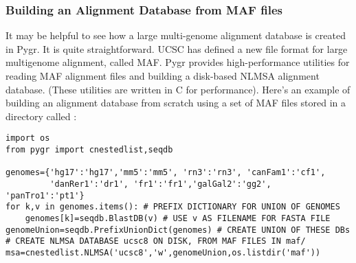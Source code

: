 \documentclass{howto}
\begin{document}
\subsubsection{Building an Alignment Database from MAF files}
It may be helpful to see how a large multi-genome alignment database
is created in Pygr.  It is quite straightforward.
UCSC has defined a new file format for large multigenome alignment,
called MAF.  Pygr provides high-performance utilities for reading
MAF alignment files and building a disk-based NLMSA alignment database.
(These utilities are written in C for performance).  Here's an
example of building an alignment database from scratch using a
set of MAF files stored in a directory called :

\begin{verbatim}
import os
from pygr import cnestedlist,seqdb

genomes={'hg17':'hg17','mm5':'mm5', 'rn3':'rn3', 'canFam1':'cf1', 
         'danRer1':'dr1', 'fr1':'fr1','galGal2':'gg2', 'panTro1':'pt1'}
for k,v in genomes.items(): # PREFIX DICTIONARY FOR UNION OF GENOMES
    genomes[k]=seqdb.BlastDB(v) # USE v AS FILENAME FOR FASTA FILE
genomeUnion=seqdb.PrefixUnionDict(genomes) # CREATE UNION OF THESE DBs
# CREATE NLMSA DATABASE ucsc8 ON DISK, FROM MAF FILES IN maf/
msa=cnestedlist.NLMSA('ucsc8','w',genomeUnion,os.listdir('maf'))
\end{verbatim}
\end{document}
